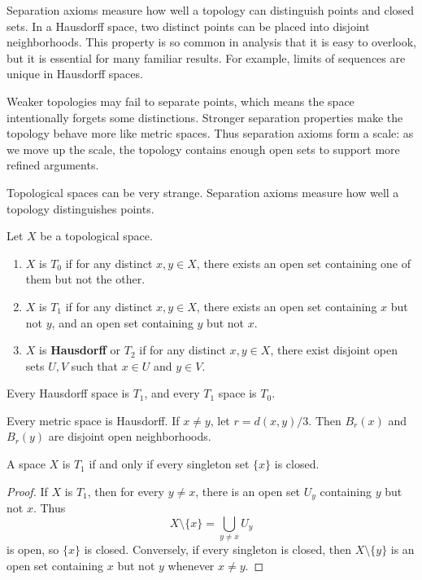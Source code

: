 Separation axioms measure how well a topology can distinguish points and closed sets. In a Hausdorff space, two distinct points can be placed into disjoint neighborhoods. This property is so common in analysis that it is easy to overlook, but it is essential for many familiar results. For example, limits of sequences are unique in Hausdorff spaces.

Weaker topologies may fail to separate points, which means the space intentionally forgets some distinctions. Stronger separation properties make the topology behave more like metric spaces. Thus separation axioms form a scale: as we move up the scale, the topology contains enough open sets to support more refined arguments.

Topological spaces can be very strange. Separation axioms measure how well a topology distinguishes points.

\begin{definition}
Let $X$ be a topological space.
\begin{enumerate}
    \item $X$ is $T_0$ if for any distinct $x,y\in X$, there exists an open set containing one of them but not the other.
    \item $X$ is $T_1$ if for any distinct $x,y\in X$, there exists an open set containing $x$ but not $y$, and an open set containing $y$ but not $x$.
    \item $X$ is \textbf{Hausdorff} or $T_2$ if for any distinct $x,y\in X$, there exist disjoint open sets $U,V$ such that $x\in U$ and $y\in V$.
\end{enumerate}
\end{definition}

\begin{proposition}
Every Hausdorff space is $T_1$, and every $T_1$ space is $T_0$.
\end{proposition}

\begin{example}
Every metric space is Hausdorff. If $x\neq y$, let $r=d(x,y)/3$. Then $B_r(x)$ and $B_r(y)$ are disjoint open neighborhoods.
\end{example}

\begin{proposition}
A space $X$ is $T_1$ if and only if every singleton set $\{x\}$ is closed.
\end{proposition}

\begin{proof}
If $X$ is $T_1$, then for every $y\neq x$, there is an open set $U_y$ containing $y$ but not $x$. Thus
\[
    X\setminus\{x\}=\bigcup_{y\neq x}U_y
\]
is open, so $\{x\}$ is closed. Conversely, if every singleton is closed, then $X\setminus\{y\}$ is an open set containing $x$ but not $y$ whenever $x\neq y$.
\end{proof}

